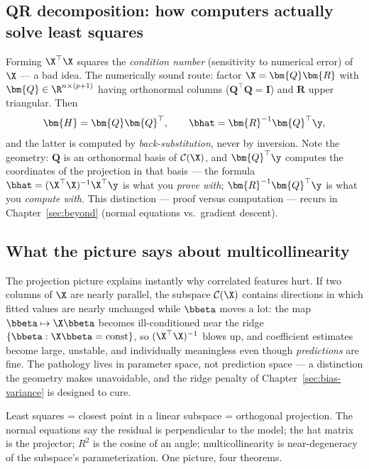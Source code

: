 \subsection{QR decomposition: how computers actually solve least squares}

Forming $\X^\top \X$ squares the \emph{condition number} (sensitivity to numerical error) of $\X$ — a bad idea. The numerically sound route: factor $\X = \bm{Q}\bm{R}$ with $\bm{Q} \in \R^{n \times (p+1)}$ having orthonormal columns ($\bm{Q}^\top \bm{Q} = \bm{I}$) and $\bm{R}$ upper triangular. Then
\[
  \bm{H} = \bm{Q}\bm{Q}^\top, \qquad
  \bhat = \bm{R}^{-1} \bm{Q}^\top \y,
\]
and the latter is computed by \emph{back-substitution}, never by inversion. Note the geometry: $\bm{Q}$ is an orthonormal basis of $\mathcal{C}(\X)$, and $\bm{Q}^\top \y$ computes the coordinates of the projection in that basis — the formula $\bhat = (\X^\top\X)^{-1}\X^\top\y$ is what you \emph{prove with}; $\bm{R}^{-1}\bm{Q}^\top\y$ is what you \emph{compute with}. This distinction — proof versus computation — recurs in Chapter~\ref{sec:beyond} (normal equations vs.\ gradient descent).

\subsection{What the picture says about multicollinearity}

The projection picture explains instantly why correlated features hurt. If two columns of $\X$ are nearly parallel, the subspace $\mathcal{C}(\X)$ contains directions in which fitted values are nearly unchanged while $\bbeta$ moves a lot: the map $\bbeta \mapsto \X\bbeta$ becomes ill-conditioned near the ridge $\{\bbeta : \X\bbeta = \text{const}\}$, so $(\X^\top\X)^{-1}$ blows up, and coefficient estimates become large, unstable, and individually meaningless even though \emph{predictions} are fine. The pathology lives in parameter space, not prediction space — a distinction the geometry makes unavoidable, and the ridge penalty of Chapter~\ref{sec:bias-variance} is designed to cure.

\begin{keybox}
Least squares = closest point in a linear subspace = orthogonal projection. The normal equations say the residual is perpendicular to the model; the hat matrix is the projector; $R^2$ is the cosine of an angle; multicollinearity is near-degeneracy of the subspace's parameterization. One picture, four theorems.
\end{keybox}

